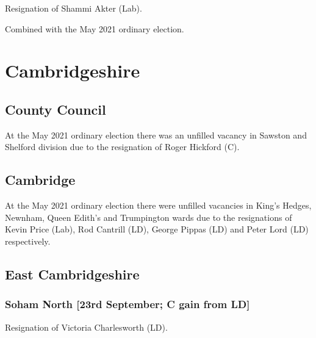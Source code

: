 \documentclass[a4paper,openany]{book}
\begin{document}
\begin{resultsiii}

Resignation of Shammi Akter (Lab).

Combined with the May 2021 ordinary election.

\section{Cambridgeshire}

\subsection*{County Council}

At the May 2021 ordinary election there was an unfilled vacancy in Sawston and Shelford division due to the resignation of Roger Hickford (C).

\subsection*{Cambridge}

At the May 2021 ordinary election there were unfilled vacancies in King's Hedges, Newnham, Queen Edith's and Trumpington wards due to the resignations of Kevin Price (Lab), Rod Cantrill (LD), George Pippas (LD) and Peter Lord (LD) respectively.

\subsection*{East Cambridgeshire}

\subsubsection*{Soham North \hspace*{\fill}\nolinebreak[1]%
	\enspace\hspace*{\fill}
	[23rd September; C gain from LD]}


Resignation of Victoria Charlesworth (LD).


\end{resultsiii}
\end{document}
